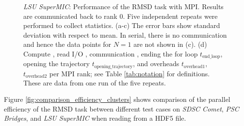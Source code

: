 \begin{figure}[!htb]
\begin{subfigure} {.5\textwidth}
    \label{fig:MPIranks-SuperMIC}
  \end{subfigure}
  \caption{\emph{LSU SuperMIC}: Performance of the RMSD task with MPI.
    Results are communicated back to rank 0.
    Five independent repeats were performed to collect statistics.
    (a-c) The error bars show standard deviation with respect to mean.
    In serial, there is no communication and hence the data points for $N=1$ are not shown in (c).
    (d) Compute \tcomp, read I/O \tIO, communication \tcomm, ending the for loop $t_{\text{end\_loop}}$,  opening the trajectory $t_{\text{opening\_trajectory}}$, and overheads $t_{\text{overhead1}}$, $t_{\text{overhead2}}$ per MPI rank; see Table \ref{tab:notation} for definitions.
    These are data from one run of the five repeats.
  }
  \label{fig:MPIwithIO-SuperMIC}
\end{figure} 


Figure \ref{fig:comparison_efficiency_clusters} shows comparison of the parallel efficiency of the RMSD task between different test cases on \emph{SDSC Comet}, \emph{PSC Bridges}, and \emph{LSU SuperMIC} when reading from a HDF5 file.

